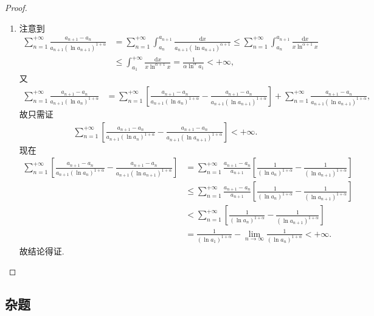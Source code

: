\documentclass[../../main.tex]{subfiles}
\begin{document}
\begin{proof}
\begin{enumerate}[(1)]
\item 注意到
\begin{align*}
\sum_{n=1}^{+\infty} \frac{a_{n+1} - a_n}{a_{n+1}(\ln a_{n+1})^{1+\alpha}} &= \sum_{n=1}^{+\infty} \int_{a_n}^{a_{n+1}} \frac{\mathrm{d}x}{a_{n+1}(\ln a_{n+1})^{\alpha + 1}} \leqslant \sum_{n=1}^{+\infty} \int_{a_n}^{a_{n+1}} \frac{\mathrm{d}x}{x\ln^{\alpha + 1}x} \\
&\leqslant \int_{a_1}^{+\infty} \frac{\mathrm{d}x}{x\ln^{\alpha + 1}x} = \frac{1}{\alpha \ln^{\alpha}a_1} < +\infty,
\end{align*}
又
\begin{align*}
\sum_{n=1}^{+\infty} \frac{a_{n+1} - a_n}{a_{n+1}(\ln a_n)^{1+\alpha}} &= \sum_{n=1}^{+\infty} \left[ \frac{a_{n+1} - a_n}{a_{n+1}(\ln a_n)^{1+\alpha}} - \frac{a_{n+1} - a_n}{a_{n+1}(\ln a_{n+1})^{1+\alpha}} \right] + \sum_{n=1}^{+\infty} \frac{a_{n+1} - a_n}{a_{n+1}(\ln a_{n+1})^{1+\alpha}},
\end{align*}
故只需证
\begin{align*}
\sum_{n=1}^{+\infty} \left[ \frac{a_{n+1} - a_n}{a_{n+1}(\ln a_n)^{1+\alpha}} - \frac{a_{n+1} - a_n}{a_{n+1}(\ln a_{n+1})^{1+\alpha}} \right] < +\infty.
\end{align*}
现在
\begin{align*}
\sum_{n=1}^{+\infty} \left[ \frac{a_{n+1} - a_n}{a_{n+1}(\ln a_n)^{1+\alpha}} - \frac{a_{n+1} - a_n}{a_{n+1}(\ln a_{n+1})^{1+\alpha}} \right] &= \sum_{n=1}^{+\infty} \frac{a_{n+1} - a_n}{a_{n+1}} \left[ \frac{1}{(\ln a_n)^{1+\alpha}} - \frac{1}{(\ln a_{n+1})^{1+\alpha}} \right] \\
&\leqslant \sum_{n=1}^{+\infty} \frac{a_{n+1} - a_n}{a_{n+1}} \left[ \frac{1}{(\ln a_n)^{1+\alpha}} - \frac{1}{(\ln a_{n+1})^{1+\alpha}} \right] \\
&< \sum_{n=1}^{+\infty} \left[ \frac{1}{(\ln a_n)^{1+\alpha}} - \frac{1}{(\ln a_{n+1})^{1+\alpha}} \right] \\
&= \frac{1}{(\ln a_1)^{1+\alpha}} - \lim_{n \rightarrow \infty} \frac{1}{(\ln a_n)^{1+\alpha}} < +\infty.
\end{align*}
故结论得证.
\end{enumerate}

\end{proof}



\subsection{杂题}
\end{document}

